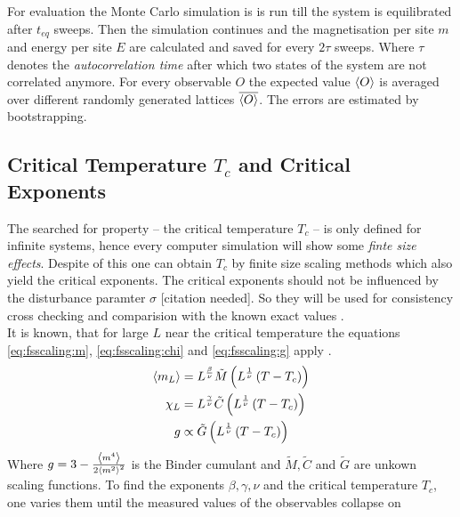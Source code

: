     For evaluation the Monte Carlo simulation is is run till the system
    is equilibrated after \(t_{eq}\) sweeps. Then the simulation continues
    and the magnetisation per site \(m\) and energy per site \(E\)
    are calculated and saved for every \(2\tau\) sweeps. Where \(\tau\)
    denotes the \emph{autocorrelation time} after which two states of
    the system are not correlated anymore.
    For every observable \(O\) the expected value \(\left< O \right>\) is averaged
    over different randomly generated lattices \(\overline{\left< O \right>}\). The
    errors are estimated by bootstrapping.

\subsection{Critical Temperature $T_c$ and Critical Exponents}
\label{ssec:finitesize}
    The searched for property -- the critical temperature \(T_c\)
    -- is only defined for infinite systems, hence every computer
    simulation will show some \emph{finte size effects}.
    Despite of this one can obtain \(T_c\) by finite size scaling
    methods \cite[S. ??]{NewmanBarkema1999} which also yield the critical
    exponents. The critical exponents should not be influenced by the
    disturbance paramter \(\sigma\) [citation needed]. So they will be
    used for consistency cross checking and comparision with the known
    exact values \cite[S. 59]{Pelissetto2002}.\\
    It is known, that for large \(L\) near the critical temperature the
    equations \eqref{eq:fsscaling:m}, \eqref{eq:fsscaling:chi} and
    \eqref{eq:fsscaling:g} apply \cite[p. 145f]{Katzgraber2011}.
    \begin{align}
        \label{eq:fsscaling:m}
        \left< m_L \right> &= L^\frac{\beta}{\nu} \tilde{M}\left(L^\frac{1}{\nu}\left(T-T_c\right)\right)\\
        \label{eq:fsscaling:chi}
        \chi_L    &= L^\frac{\gamma}{\nu} \tilde{C}\left(L^\frac{1}{\nu}\left(T-T_c\right)\right)\\
        \label{eq:fsscaling:g}
        g         &\propto \tilde{G}\left(L^\frac{1}{\nu}\left(T-T_c\right)\right)
    \end{align}
    Where \(g = 3-\frac{\left< m^4 \right>}{2\left< m^2 \right>^2}\) \cite{Binder1981} is
    the Binder cumulant and \(\tilde{M}, \tilde{C}\) and \(\tilde{G}\)
    are unkown scaling functions. To find the exponents
    \(\beta, \gamma, \nu\) and the critical temperature \(T_c\), one
    varies them until the measured values of the observables collapse on
